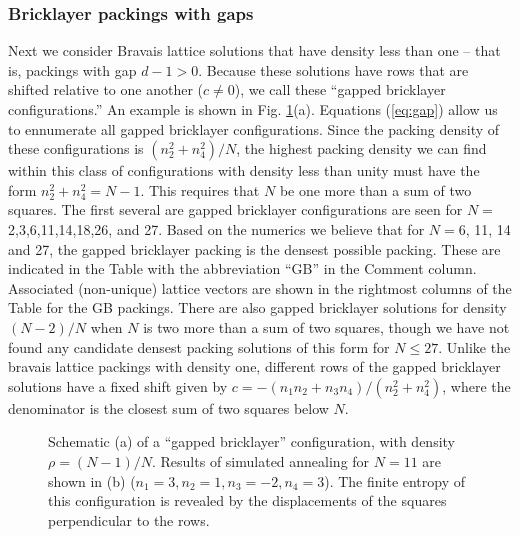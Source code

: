 \documentclass{umthesis}          %
\begin{document}
\subsubsection{Bricklayer packings with gaps}
\label{sec:bricklayer}
Next we consider Bravais lattice solutions that have density less than one -- that is, packings with gap $d-1 > 0$.  Because these solutions have rows that are shifted relative to one another ($c\neq 0$), we call these ``gapped bricklayer configurations.''  An example is shown in Fig. \ref{fig:gb}(a).  Equations (\ref{eq:gap}) allow us to ennumerate all gapped bricklayer configurations. Since the packing density of these configurations is $(n_2^2 + n_4^2)/N$, the highest packing density we can find within this class of configurations with density less than unity must have the form $n_2^2 + n_4^2 = N-1$.  This requires that $N$ be one more than a sum of two squares. The first several are gapped bricklayer configurations are seen for $N=$ 2,3,6,11,14,18,26, and 27.  Based on the numerics we believe that for $N=6$, 11, 14 and 27, the gapped bricklayer packing is the densest possible packing. These are indicated in the Table with the abbreviation ``GB'' in the Comment column. Associated (non-unique) lattice vectors are shown in the rightmost columns of the Table for the GB packings.  There are also gapped bricklayer solutions for density $(N-2)/N$ when $N$ is two more than a sum of two squares, though we have not found any candidate densest packing solutions of this form for $N \leq 27$. Unlike the bravais lattice packings with density one, different rows of the gapped bricklayer solutions have a fixed shift given by $c = - (n_1 n_2 + n_3 n_4)/(n_2^2 + n_4^2)$, where the denominator is the closest sum of two squares below $N$. 

\begin{figure}[H]
\caption{\label{fig:gb}Schematic (a) of a ``gapped bricklayer'' configuration, with density $\rho = (N-1)/N$. Results of simulated annealing for $N=11$ are shown in (b) ($n_1=3, n_2=1, n_3=-2, n_4=3$).  The finite entropy of this configuration is revealed by the displacements of the squares perpendicular to the rows.}
\end{figure}
\end{document}
